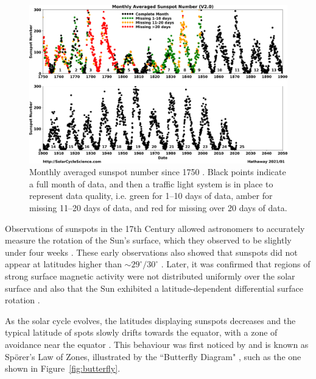 \begin{figure}[ht!]
	\centering
	\includegraphics[width=\columnwidth]{SSN_monthly_landscape.png}
	\caption{Monthly averaged sunspot number since 1750 \citep{hathaway_solar_2017}. Black points indicate a full month of data, and then a traffic light system is in place to represent data quality, i.e. green for 1--10 days of data, amber for missing 11--20 days of data, and red for missing over 20 days of data.}
	\label{fig:ssn}
\end{figure}

Observations of sunspots in the 17th Century allowed astronomers to accurately measure the rotation of the Sun's surface, which they observed to be slightly under four weeks \citep{casanovas_early_1997, casas_solar_2006, luminet_reception_2017}. These early observations also showed that sunspots did not appear at latitudes higher than $\sim$$29^{\circ}/30^{\circ}$ \citep{casanovas_early_1997}. Later, it was confirmed that regions of strong surface magnetic activity were not distributed uniformly over the solar surface and also that the Sun exhibited a latitude-dependent differential surface rotation \citep{lee_cyril_1858}. %

As the solar cycle evolves, the latitudes displaying sunspots decreases and the typical latitude of spots slowly drifts towards the equator, with a zone of avoidance near the equator \citep{hathaway_solar_2015}. This behaviour was first noticed by \citet{carrington_observations_1863} and is known as Sp\"{o}rer's Law of Zones, illustrated by the ``Butterfly Diagram" \citep{maunder_spoerers_1903, maunder_note_1904}, such as the one shown in Figure~\ref{fig:butterfly}.

